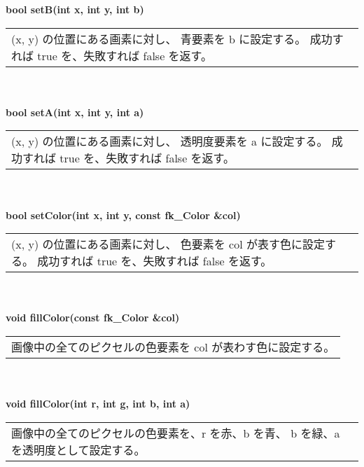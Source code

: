 \begin{tabbing}
\> \textbf{bool setB(int x, int y, int b)} \\
	\> \> \begin{tabular}{p{15cm}}
		(x, y) の位置にある画素に対し、
		青要素を b に設定する。
		成功すれば true を、失敗すれば false を返す。
	\end{tabular} \\ \\

\> \textbf{bool setA(int x, int y, int a)} \\
	\> \> \begin{tabular}{p{15cm}}
		(x, y) の位置にある画素に対し、
		透明度要素を a に設定する。
		成功すれば true を、失敗すれば false を返す。
	\end{tabular} \\ \\

\> \textbf{bool setColor(int x, int y, const fk\_Color \&col)} \\
	\> \> \begin{tabular}{p{15cm}}
		(x, y) の位置にある画素に対し、
		色要素を col が表す色に設定する。
		成功すれば true を、失敗すれば false を返す。
	\end{tabular} \\ \\

\> \textbf{void fillColor(const fk\_Color \&col)} \\
	\> \> \begin{tabular}{p{15cm}}
		画像中の全てのピクセルの色要素を col が表わす色に設定する。
	\end{tabular} \\ \\

\> \textbf{void fillColor(int r, int g, int b, int a)} \\
	\> \> \begin{tabular}{p{15cm}}
		画像中の全てのピクセルの色要素を、r を赤、b を青、
		b を緑、a を透明度として設定する。
	\end{tabular}
\end{tabbing}
